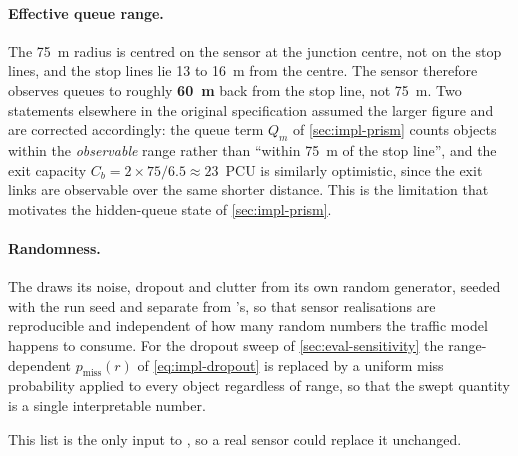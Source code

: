 \paragraph{Effective queue range.} The 75~m radius is centred on the sensor at the junction centre, not on the
stop lines, and the stop lines lie 13 to 16~m from the centre. The sensor therefore observes queues to roughly
\textbf{60~m} back from the stop line, not 75~m. Two statements elsewhere in the original specification assumed
the larger figure and are corrected accordingly: the queue term $Q_m$ of \cref{sec:impl-prism} counts objects
within the \emph{observable} range rather than ``within 75~m of the stop line'', and the exit capacity
$C_b = 2 \times 75/6.5 \approx 23$~PCU is similarly optimistic, since the exit links are observable over the
same shorter distance. This is the limitation that motivates the hidden-queue state of \cref{sec:impl-prism}.

\paragraph{Randomness.} The \vls{} draws its noise, dropout and clutter from its own random generator, seeded
with the run seed and separate from \sumo{}'s, so that sensor realisations are reproducible and independent of
how many random numbers the traffic model happens to consume. For the dropout sweep of
\cref{sec:eval-sensitivity} the range-dependent $p_{\text{miss}}(r)$ of \cref{eq:impl-dropout} is replaced by a
uniform miss probability applied to every object regardless of range, so that the swept quantity is a single
interpretable number.

This list is the only input to \prism{}, so a real sensor could replace it unchanged.

